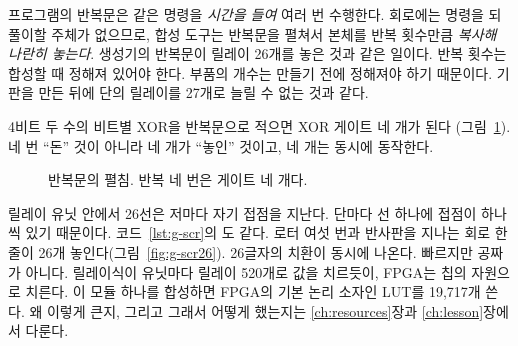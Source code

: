\Why 프로그램의 반복문은 같은 명령을 \emph{시간을 들여} 여러 번 수행한다. 회로에는 명령을 되풀이할
주체가 없으므로, 합성 도구는 반복문을 펼쳐서 본체를 반복 횟수만큼 \emph{복사해 나란히 놓는다}. 생성기의
반복문이 릴레이 26개를 놓은 것과 같은 일이다. 반복 횟수는 합성할 때 정해져 있어야 한다. 부품의 개수는 만들기
전에 정해져야 하기 때문이다. 기판을 만든 뒤에 단의 릴레이를 27개로 늘릴 수 없는 것과 같다.

\General 4비트 두 수의 비트별 XOR을 반복문으로 적으면 XOR 게이트 네 개가 된다
(그림~\ref{fig:g-unroll}). 네 번 ``돈'' 것이 아니라 네 개가 ``놓인'' 것이고, 네 개는 동시에 동작한다.

\begin{figure}[ht]
\centering
{}
\caption{반복문의 펼침. 반복 네 번은 게이트 네 개다.}
\label{fig:g-unroll}
\end{figure}

\Ours 릴레이 유닛 안에서 26선은 저마다 자기 접점을 지난다. 단마다 선 하나에 접점이 하나씩 있기 때문이다.
코드~\ref{lst:g-scr}의 도 같다. 로터 여섯 번과 반사판을 지나는
회로 한 줄이 26개 놓인다(그림~\ref{fig:g-scr26}). 26글자의 치환이 동시에 나온다. 빠르지만 공짜가 아니다.
릴레이식이 유닛마다 릴레이 520개로 값을 치르듯이, FPGA는 칩의 자원으로 치른다. 이 모듈 하나를 합성하면 FPGA의
기본 논리 소자인 LUT를 19,717개 쓴다. 왜 이렇게 큰지, 그리고 그래서 어떻게 했는지는 \ref{ch:resources}장과
\ref{ch:lesson}장에서 다룬다.

